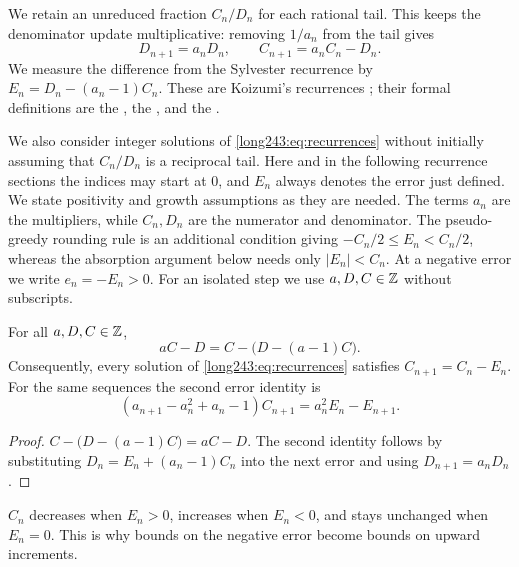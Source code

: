 \documentclass[11pt]{article}
\begin{document}
We retain an unreduced fraction $C_n/D_n$ for each rational tail.
This keeps the denominator update multiplicative: removing $1/a_n$
from the tail gives
\begin{equation}\label{long243:eq:recurrences}
 D_{n+1}=a_nD_n,\qquad C_{n+1}=a_nC_n-D_n.
\end{equation}
We measure the difference from the Sylvester recurrence by
$E_n=D_n-(a_n-1)C_n$. These are Koizumi's recurrences
\cite[Lemma~4, pp.~11--12]{koizumi2025}; their formal definitions are the
, the
,
and the
.

We also consider integer solutions of \eqref{long243:eq:recurrences}
without initially assuming that $C_n/D_n$ is a reciprocal tail.
Here and in the following recurrence sections the indices may start
at $0$, and $E_n$ always denotes the error just defined. We state
positivity and growth assumptions as they are needed. The terms $a_n$
are the multipliers, while $C_n,D_n$ are the numerator and denominator.
The pseudo-greedy rounding rule is an additional condition giving $-C_n/2\le E_n<C_n/2$, whereas the
absorption argument below needs only $|E_n|<C_n$. At a negative error we
write $e_n=-E_n>0$. For an isolated step we use $a,D,C\in\mathbb{Z}$ without
subscripts.

\begin{proposition}\label{long243:res:update}
For all $a,D,C\in\mathbb{Z}$,
\[
 aC-D=C-\bigl(D-(a-1)C\bigr).
\]
Consequently, every solution of \eqref{long243:eq:recurrences} satisfies $C_{n+1}=C_n-E_n$.
For the same sequences the second error identity is
\[
 (a_{n+1}-a_n^2+a_n-1)C_{n+1}=a_n^2E_n-E_{n+1}.
\]
\end{proposition}

\begin{proof}
$C-\bigl(D-(a-1)C\bigr)=aC-D$. The second identity follows
by substituting $D_n=E_n+(a_n-1)C_n$ into the next error and using
$D_{n+1}=a_nD_n$.
\end{proof}

$C_n$ decreases when $E_n>0$, increases when $E_n<0$, and
stays unchanged when $E_n=0$. This is why bounds on the negative error
become bounds on upward increments.
\end{document}
